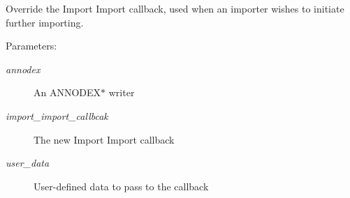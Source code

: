 Override the Import Import callback, used when an importer wishes to initiate further importing. 

\begin{Desc}
\item[Parameters:]
\begin{description}
\item[{\em annodex}]An ANNODEX$\ast$ writer \item[{\em import\_\-import\_\-callbcak}]The new Import Import callback \item[{\em user\_\-data}]User-defined data to pass to the callback \end{description}
\end{Desc}
